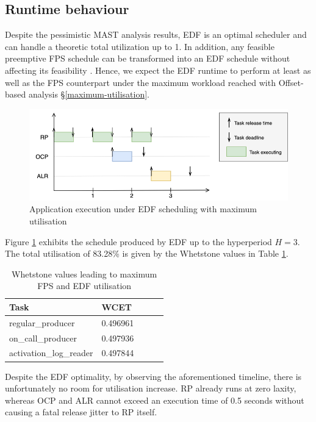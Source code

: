 \documentclass{article}
\begin{document}
\subsection{Runtime behaviour}

Despite the pessimistic MAST analysis results, EDF is an optimal scheduler and can handle a theoretic total utilization up to 1. In addition, any feasible preemptive FPS schedule can be transformed into an EDF schedule without affecting its feasibility \cite{spuri}. Hence, we expect the EDF runtime to perform at least as well as the FPS counterpart under the maximum workload reached with Offset-based analysis §\ref{maximum-utilisation}.

\begin{figure}[!htbp]
   \centering
   \includegraphics[width=6in]{images/timeline-edf-offsets}
   \caption{Application execution under EDF scheduling with maximum utilisation}
   \label{fig:timeline-edf-offsets}
\end{figure}

Figure \ref{fig:timeline-edf-offsets} exhibits the schedule produced by EDF up to the hyperperiod $H=3$. The total utilisation of 83.28\% is given by the Whetstone values in Table \ref{tab:Whet-max-util}.

\begin{table}[!htbp]
   \centering
   \begin{tabular}{lllcl}
    \toprule
    Task & WCET \\
    \midrule
    regular\_producer & 0.496961     \\
    on\_call\_producer & 0.497936     \\
    activation\_log\_reader & 0.497844 \\
    \toprule
   \end{tabular}
   \caption{Whetstone values leading to maximum FPS and EDF utilisation}
   \label{tab:Whet-max-util}
 \end{table}

\newpage

Despite the EDF optimality, by observing the aforementioned timeline, there is unfortunately no room for utilisation increase. RP already runs at zero laxity, whereas OCP and ALR cannot exceed an execution time of 0.5 seconds without causing a fatal release jitter to RP itself.
\end{document}

